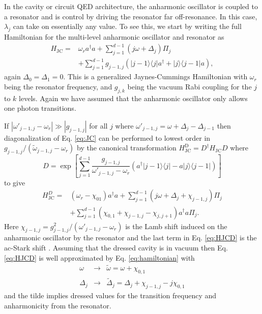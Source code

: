 \documentclass[pra,twocolumn,floatfix,superscriptaddress,eqsecnum]{revtex4-1}
\newcommand{\bra}[1]{\langle{#1}|}
\newcommand{\ket}[1]{|{#1}\rangle}
\begin{document}
In the cavity or circuit QED
architecture, the anharmonic oscillator is coupled to a resonator and is control by driving the resonator far off-resonance. In this case, $\lambda_j$ can take on essentially any value. To see this, we start by writing the full Hamiltonian for the multi-level anharmonic oscillator and resonator as
\begin{equation}\label{eq:JC}
\begin{split}
H_\mathrm{JC} =& \omega_r a^\dagger a + \sum_{j=1}^{d-1}(j\omega+\Delta_j)\Pi_j \\&+ \sum_{j=1}^{d-1} g_{j-1,j}\left( \ket{j-1}\bra{j}a^\dagger+\ket{j}\bra{j-1}a\right),
\end{split}
\end{equation} again $\Delta_0=\Delta_1=0$. This is a generalized Jaynes-Cummings Hamiltonian \cite{Jaynes1963} with $\omega_r$ being the resonator frequency, and $g_{j,k}$ being the vacuum Rabi coupling for the $j$ to $k$ levels. Again we have assumed that the anharmonic oscillator only allows one photon transitions.

If $|\omega'_{j-1,j}-\omega_r|\gg |g_{j-1,j}|$ for all $j$ where $\omega'_{j-1,j}=\omega+\Delta_j-\Delta_{j-1}$ then diagonalization of Eq. \eqref{eq:JC} can be performed to lowest order in $g_{j-1,j}/(\tilde\omega_{j-1,j}-\omega_r)$ by the canonical transformation $H_\mathrm{JC}^\mathrm{D}= D^\dagger H_\mathrm{JC} D$ where
\begin{equation}\label{eq:D}D=\exp\left[\sum_{j=1}^{d-1} \frac{g_{j-1,j}}{\omega'_{j-1,j}-\omega_r}( a^\dagger \ket{j-1}\bra{j}-a \ket{j}\bra{j-1})\right]\end{equation}  to give
\begin{equation}
\begin{split}
H_\mathrm{JC}^D=&(\omega_r-\chi_{01}) a^\dagger a + \sum_{j=1}^{d-1}\left(j\omega+\Delta_j+\chi_{j-1,j}\right)\Pi_j\\&+\sum_{j=1}^{d-1}(\chi_{0,1}+\chi_{j-1,j}-\chi_{j,j+1})a^\dagger a\Pi_j.
\end{split}\label{eq:HJCD}
\end{equation} Here $\chi_{j-1,j}={g_{j-1,j}^2}/{(\omega'_{j-1,j}-\omega_r)}$ is the Lamb shift induced on the  anharmonic oscillator by the resonator and the last term in Eq. \eqref{eq:HJCD} is the ac-Stark shift \cite{Gambetta2006}.  Assuming that the dressed cavity is in vacuum  then Eq. \eqref{eq:HJCD} is well approximated by Eq. \eqref{eq:hamiltonian} with
\begin{eqnarray}\label{eqs:replace}
\omega&\rightarrow&\tilde\omega=\omega+\chi_{0,1}\\
\Delta_j&\rightarrow&\tilde\Delta_j=\Delta_j+\chi_{j-1,j}-j\chi_{0,1}
\end{eqnarray} and the tilde implies dressed values for the transition frequency and anharmonicity from the resonator.
\end{document}
